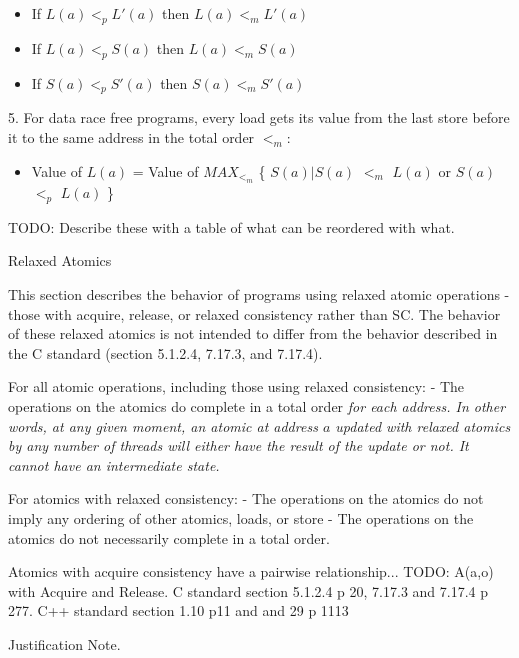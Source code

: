 \begin{itemize}
  \item If $L(a) <_p L'(a)$ then $L(a) <_m L'(a)$
  \item If $L(a) <_p S(a)$ then $L(a) <_m S(a)$
  \item If $S(a) <_p S'(a)$ then $S(a) <_m S'(a)$
\end{itemize}

5. For data race free programs, every load gets its value from the last store before it to the same address in the total order $<_m$:
\begin{itemize}
  \item Value of $L(a)$ = Value of $MAX_{<_m}$ \{ $S(a)|S(a)$ $<_m$ $L(a)$ or $S(a)$ $<_p$ $L(a)$ \}
\end{itemize}

TODO: Describe these with a table of what can be reordered with what.

Relaxed Atomics

This section describes the behavior of programs using relaxed atomic operations
- those with acquire, release, or relaxed consistency rather than SC. The
behavior of these relaxed atomics is not intended to differ from the behavior
described in the C standard (section 5.1.2.4, 7.17.3, and 7.17.4).

For all atomic operations, including those using relaxed consistency:
 - The operations on the atomics do complete in a total order \it{for each address}. In other words, at any given moment, an atomic at address $a$ updated with relaxed atomics by any number of threads will either have the result of the update or not. It cannot have an intermediate state.

For atomics with relaxed consistency:
 - The operations on the atomics do not imply any ordering of other atomics, loads, or store
 - The operations on the atomics do not necessarily complete in a total order.

Atomics with acquire consistency have a pairwise relationship...
TODO: A(a,o) with Acquire and Release. C standard section 5.1.2.4 p 20, 7.17.3 and 7.17.4 p 277. C++ standard section 1.10 p11 and and 29 p 1113

Justification Note.

